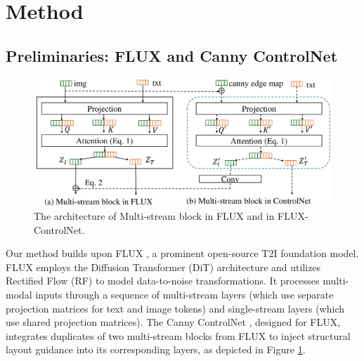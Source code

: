 \documentclass{article}
\begin{document}
\section{Method}
\subsection{Preliminaries: FLUX and Canny ControlNet}

\begin{figure}
  \vspace{-12pt} %
    \includegraphics[width=1\linewidth]{figures/FLUX-double-controlnet.pdf}
    \caption{The architecture of Multi-stream block in FLUX and in FLUX-ControlNet.}
    \label{fig:FLUX_controlnet}
      \vspace{-5pt} %
\end{figure}

Our method builds upon FLUX \citep{blackforest2024FLUX}, a prominent open-source T2I foundation model. FLUX employs the Diffusion Transformer (DiT) architecture \citep{peebles2023scalable} and utilizes Rectified Flow (RF) \citep{liu2022flow} to model data-to-noise transformations. It processes multi-modal inputs through a sequence of multi-stream layers (which use separate projection matrices for text and image tokens) and single-stream layers (which use shared projection matrices). The Canny ControlNet \citep{xlabsai2025fluxcontrolnet}, designed for FLUX, integrates duplicates of two multi-stream blocks from FLUX to inject structural layout guidance into its corresponding layers, as depicted in Figure \ref{fig:FLUX_controlnet}.
\end{document}
